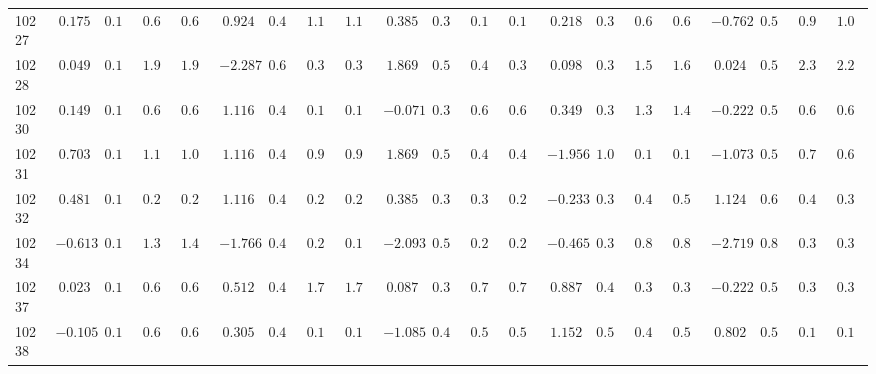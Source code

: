 \documentclass[6pt]{article}
\begin{document}
\begin{landscape}
{\begin{longtable}{lrrrrrrrrrrrrrrrrrrrr}
10227&$ 0.175$&$0.160$&$0.643$&$0.614$&$ 0.924$&$0.438$&$1.125$&$1.129$&$ 0.385$&$0.386$&$0.160$&$0.163$&$ 0.218$&$0.370$&$0.636$&$0.640$&$-0.762$&$0.547$&$0.949$&$1.009$\tabularnewline
10228&$ 0.049$&$0.160$&$1.940$&$1.938$&$-2.287$&$0.601$&$0.351$&$0.333$&$ 1.869$&$0.531$&$0.406$&$0.381$&$ 0.098$&$0.359$&$1.548$&$1.637$&$ 0.024$&$0.513$&$2.322$&$2.252$\tabularnewline
10230&$ 0.149$&$0.160$&$0.660$&$0.668$&$ 1.116$&$0.430$&$0.165$&$0.163$&$-0.071$&$0.399$&$0.641$&$0.645$&$ 0.349$&$0.386$&$1.326$&$1.429$&$-0.222$&$0.517$&$0.640$&$0.621$\tabularnewline
10231&$ 0.703$&$0.173$&$1.179$&$1.084$&$ 1.116$&$0.430$&$0.934$&$0.913$&$ 1.869$&$0.531$&$0.438$&$0.479$&$-1.956$&$1.082$&$0.145$&$0.149$&$-1.073$&$0.572$&$0.700$&$0.652$\tabularnewline
10232&$ 0.481$&$0.164$&$0.289$&$0.281$&$ 1.116$&$0.430$&$0.227$&$0.222$&$ 0.385$&$0.386$&$0.302$&$0.298$&$-0.233$&$0.355$&$0.496$&$0.538$&$ 1.124$&$0.635$&$0.408$&$0.398$\tabularnewline
10234&$-0.613$&$0.179$&$1.334$&$1.408$&$-1.766$&$0.470$&$0.225$&$0.193$&$-2.093$&$0.524$&$0.271$&$0.262$&$-0.465$&$0.378$&$0.843$&$0.894$&$-2.719$&$0.854$&$0.301$&$0.304$\tabularnewline
10237&$ 0.023$&$0.160$&$0.698$&$0.689$&$ 0.512$&$0.443$&$1.727$&$1.715$&$ 0.087$&$0.394$&$0.793$&$0.764$&$ 0.887$&$0.493$&$0.390$&$0.351$&$-0.222$&$0.517$&$0.323$&$0.344$\tabularnewline
10238&$-0.105$&$0.162$&$0.666$&$0.673$&$ 0.305$&$0.437$&$0.108$&$0.111$&$-1.085$&$0.424$&$0.563$&$0.535$&$ 1.152$&$0.567$&$0.480$&$0.520$&$ 0.802$&$0.573$&$0.197$&$0.151$\tabularnewline
\hline
\end{longtable}}\end{landscape}
\end{document}
